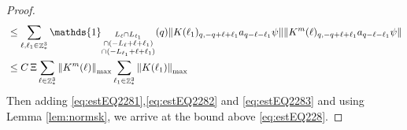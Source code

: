 \documentclass[sn-mathphys, Numbered ,a4paper]{sn-jnl}%
\DeclareMathOperator{\Z}{\mathbb{Z}}
\theoremstyle{plain}
\theoremstyle{definition}
\theoremstyle{remark}
\theoremstyle{plain}
\theoremstyle{definition}
\theoremstyle{remark}
\begin{document}
{\begin{proof}
\begin{align}
	&\leq \sum\limits_{\ell, \ell_1\in \Z^3_*} \mathds{1}_{\substack{L_{\ell}\cap L_{\ell_1}\\\cap (-L_{\ell}+\ell+\ell_1) \\ \cap (-L_{\ell_1}+\ell+\ell_1)}} (q) \norm{K(\ell_1)_{q,-q+\ell+\ell_1} a_{q-\ell-\ell_1} \psi}\norm{ K^m(\ell)_{q,-q+\ell+\ell_1} a_{q-\ell-\ell_1}\psi }\nonumber\\
	&\leq C\,\Xi \sum\limits_{\ell \in \Z^3_*} \norm{K^m(\ell)}_{\mathrm{max}} \sum\limits_{\ell_1 \in \Z^3_*} \norm{K(\ell_1)}_{\mathrm{max}} \label{eq:estEQ2283}
\end{align} 
Then adding \eqref{eq:estEQ2281},\eqref{eq:estEQ2282} and \eqref{eq:estEQ2283} and using Lemma \ref{lem:normsk}, we arrive at the bound above \eqref{eq:estEQ228}.  
\end{proof}}
\end{document}
